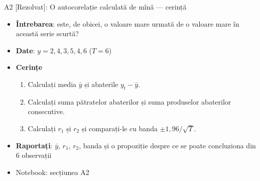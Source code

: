\begin{frame}{A2 [Rezolvat]: O autocorelație calculată de mînă --- cerință}
\itemsize{\small}
\begin{itemize}
\item \textbf{Întrebarea}: este, de obicei, o valoare mare urmată de o valoare mare în această serie scurtă?
\item \textbf{Date}: $y = 2, 4, 3, 5, 4, 6$ ($T = 6$)
\item \textbf{Cerințe}
\begin{enumerate}
    \item Calculați media $\bar y$ și abaterile $y_t - \bar y$.
    \item Calculați suma pătratelor abaterilor și suma produselor abaterilor consecutive.
    \item Calculați $r_1$ și $r_2$ și comparați-le cu banda $\pm 1{,}96/\sqrt T$.
\end{enumerate}
\item \textbf{Raportați}: $\bar y$, $r_1$, $r_2$, banda și o propoziție despre ce se poate concluziona din 6 observații
\item Notebook: secțiunea A2
\end{itemize}
\end{frame}

